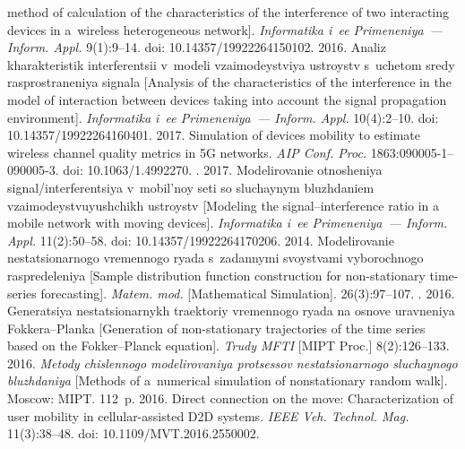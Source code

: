 \begin{multicols}{2}
{{\begin{thebibliography}{99}
method of calculation of the characteristics of the interference of two interacting devices in 
a~wireless heterogeneous network]. \textit{Informatika i~ee Primeneniya~--- Inform. Appl.} 
9(1):9--14. doi: 10.14357/19922264150102.
2016. Analiz kharakteristik interferentsii v~modeli vzaimodeystviya ustroystv s~uchetom sredy 
rasprostraneniya signala [Analysis of the characteristics of the interference in the model of 
interaction between devices taking into account the signal propagation environment]. 
\textit{Informatika i~ee Primeneniya~--- Inform. Appl.} 10(4):2--10. doi: 
10.14357/19922264160401.
 2017. Simulation of devices mobility to estimate wireless channel quality 
metrics in 5G networks. \textit{AIP Conf. Proc.} 1863:090005-1--090005-3. 
doi: 10.1063/1.4992270.
. 2017. 
Modelirovanie otnosheniya signal/interferentsiya v~mobil'noy seti so sluchaynym bluzhdaniem 
vzaimodeystvuyushchikh ustroystv [Modeling the signal--interference ratio in a mobile network with 
moving devices]. \textit{Informatika i~ee Primeneniya~--- Inform. Appl.} 11(2):50--58. 
doi:  10.14357/19922264170206.
 2014. Modelirovanie 
nestatsionarnogo vremennogo ryada s~zadannymi svoystvami vyborochnogo raspredeleniya 
[Sample distribution function construction for non-stationary time-series forecasting]. 
\textit{Matem. mod.} [Mathematical Simulation]. 26(3):97--107. %
. 2016. Generatsiya ne\-sta\-tsi\-o\-nar\-nykh traektoriy 
vremennogo ryada na osnove uravneniya Fokkera--Planka [Generation of non-stationary 
trajectories of the time series based on the Fokker--Planck equation]. 
\textit{Trudy MFTI} 
[MIPT Proc.] 8(2):126--133. %
 2016. \textit{Metody chislennogo modelirovaniya 
protsessov nestatsionarnogo sluchaynogo bluzhdaniya} 
[Methods of a~numerical simulation of nonstationary random walk]. Moscow: MIPT. 112~p.
 2016. Direct connection on the move: Characterization of user 
mobility in cellular-assisted D2D systems. \textit{IEEE Veh. Technol. Mag.} 11(3):38--48. 
doi:  10.1109/MVT.2016.2550002.
\end{thebibliography}

 }
 }

\end{multicols}

